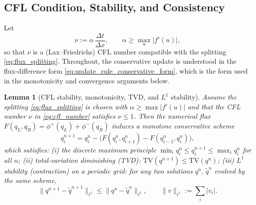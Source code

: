 \documentclass[sn-basic]{sn-jnl}
\theoremstyle{plain}
\newtheorem{lemma}[theorem]{Lemma}
\theoremstyle{remark}
\begin{document}
\subsection{CFL Condition, Stability, and Consistency}
\label{subsec:stability}

Let
\begin{equation}
\nu := \alpha\,\frac{\Delta t}{\Delta x},
\qquad \alpha \ge \max_u |f'(u)|,
\label{eq:cfl_number}
\end{equation}
so that \(\nu\) is a (Lax--Friedrichs) CFL number compatible with the splitting \cref{eq:flux_splitting}. Throughout, the conservative update is understood in the flux-difference form \cref{eq:update_rule_conservative_form}, which is the form used in the monotonicity and convergence arguments below.

\begin{lemma}[CFL stability, monotonicity, TVD, and \texorpdfstring{$L^1$}{L1} stability]
\label{lem:cfl_monotone}
Assume the splitting \cref{eq:flux_splitting} is chosen with \(\alpha \ge \max|f'(u)|\) and that the CFL number \(\nu\) in \cref{eq:cfl_number} satisfies \(\nu\le 1\).
Then the numerical flux
\(
F(q_L,q_R)=\phi^+(q_L)+\phi^-(q_R)
\)
induces a monotone conservative scheme
\begin{equation}
q_i^{n+1}=q_i^n-\Big(F(q_i^n,q_{i+1}^n)-F(q_{i-1}^n,q_i^n)\Big),
\label{eq:monotone_scheme_form}
\end{equation}
which satisfies:
(i) the discrete maximum principle
\(\min_i q_i^n \le q_i^{n+1} \le \max_i q_i^n\) for all \(n\);
(ii) total-variation diminishing (TVD): \(\mathrm{TV}(q^{n+1})\le \mathrm{TV}(q^n)\);
(iii) \(L^1\) stability (contraction) on a periodic grid: for any two solutions \(q^n,\,\tilde q^n\) evolved by the same scheme,
\begin{equation}
\|q^{n+1}-\tilde q^{n+1}\|_{\ell^1} \le \|q^{n}-\tilde q^{n}\|_{\ell^1},
\qquad \|v\|_{\ell^1}:=\sum_i |v_i|.
\label{eq:l1_contraction}
\end{equation}
\end{lemma}
\end{document}
